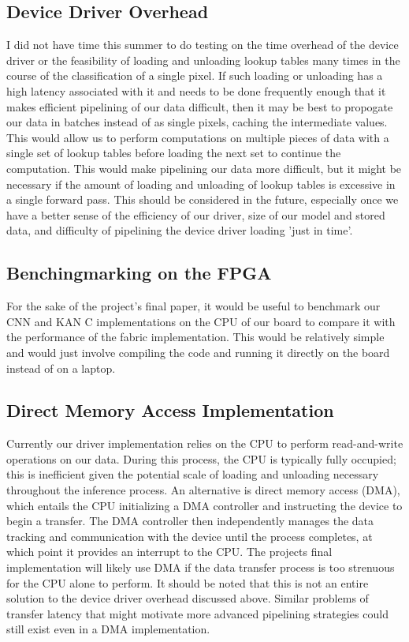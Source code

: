 \documentclass[psamsfonts]{amsart}
\theoremstyle{definition}
\theoremstyle{remark}
\numberwithin{equation}{section}
\begin{document}
\subsection{Device Driver Overhead}
I did not have time this summer to do testing on the time overhead of the device driver or the feasibility of loading and unloading lookup tables many times in the course of the classification of a single pixel. If such loading or unloading has a high latency associated with it and needs to be done frequently enough that it makes efficient pipelining of our data difficult, then it may be best to propogate our data in batches instead of as single pixels, caching the intermediate values. This would allow us to perform computations on multiple pieces of data with a single set of lookup tables before loading the next set to continue the computation. This would make pipelining our data more difficult, but it might be necessary if the amount of loading and unloading of lookup tables is excessive in a single forward pass. This should be considered in the future, especially once we have a better sense of the efficiency of our driver, size of our model and stored data, and difficulty of pipelining the device driver loading 'just in time'.

\subsection{Benchingmarking on the FPGA}
For the sake of the project's final paper, it would be useful to benchmark our CNN and KAN C implementations on the CPU of our board to compare it with the performance of the fabric implementation. This would be relatively simple and would just involve compiling the code and running it directly on the board instead of on a laptop.

\subsection{Direct Memory Access Implementation}
Currently our driver implementation relies on the CPU to perform read-and-write operations on our data. During this process, the CPU is typically fully occupied; this is inefficient given the potential scale of loading and unloading necessary throughout the inference process. An alternative is direct memory access (DMA), which entails the CPU initializing a DMA controller and instructing the device to begin a transfer. The DMA controller then independently manages the data tracking and communication with the device until the process completes, at which point it provides an interrupt to the CPU. The projects final implementation will likely use DMA if the data transfer process is too strenuous for the CPU alone to perform. It should be noted that this is not an entire solution to the device driver overhead discussed above. Similar problems of transfer latency that might motivate more advanced pipelining strategies could still exist even in a DMA implementation. %
\end{document}
